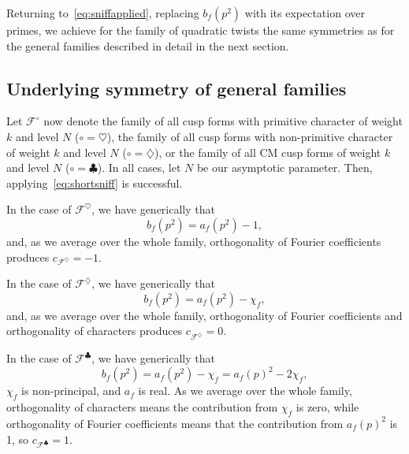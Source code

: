\documentclass[11pt,reqno]{amsart} \usepackage{fullpage}
\newcommand\be{\begin{equation}}
\newcommand\ee{\end{equation}}
\numberwithin{equation}{section}
\begin{document}
Returning to~\eqref{eq:sniffapplied}, replacing $b_f\left(p^2\right)$ with its expectation
over primes, we achieve for the family of quadratic twists the same symmetries as for the
general families described in detail in the next section.

\subsection{Underlying symmetry of general families}
Let $\mathcal F^\circ$ now denote the family of all cusp forms with primitive
character of weight $k$ and level $N$ ($\circ=\heartsuit$), the family of all cusp forms
with non-primitive character of weight $k$ and level $N$ ($\circ=\diamondsuit$), or
the family of all CM cusp forms of weight $k$ and level $N$ ($\circ=\clubsuit$). In all
cases, let $N$ be our asymptotic parameter. Then, applying~\eqref{eq:shortsniff} is
successful. 

In the case of $\mathcal F^\heartsuit$, we have generically that
\be b_f\left(p^2\right)=a_f\left(p^2\right)-1,\ee and, as we average over the whole family,
orthogonality of Fourier coefficients produces $c_{\mathcal F^\heartsuit}=-1$.

In the case of $\mathcal F^\diamondsuit$, we have generically that
\be b_f\left(p^2\right)=a_f\left(p^2\right)-\chi_f,\ee and, as we average over the whole
family, orthogonality of Fourier coefficients and orthogonality of characters produces
$c_{\mathcal F^\diamondsuit}=0$.

In the case of $\mathcal F^\clubsuit$, we have generically that
\be b_f\left(p^2\right)=a_f\left(p^2\right)-\chi_f=a_f(p)^2-2\chi_f,\ee $\chi_f$ is
non-principal, and $a_f$ is real. As we average over the whole
family, orthogonality of characters means the contribution from $\chi_f$ is zero, while
orthogonality of Fourier coefficients means that the contribution from $a_f(p)^2$ is 1,
so $c_{\mathcal F^\clubsuit}=1$.





\end{document}
